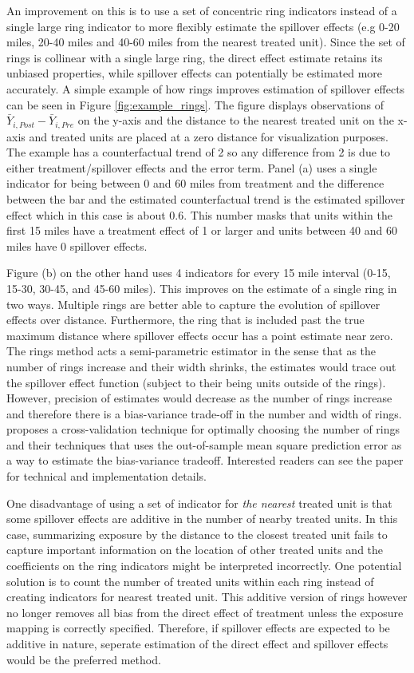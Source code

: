 \documentclass[11pt]{article}
\begin{document}
An improvement on this is to use a set of concentric ring indicators instead of a single large ring indicator to more flexibly estimate the spillover effects (e.g 0-20 miles, 20-40 miles and 40-60 miles from the nearest treated unit). Since the set of rings is collinear with a single large ring, the direct effect estimate retains its unbiased properties, while spillover effects can potentially be estimated more accurately. A simple example of how rings improves estimation of spillover effects can be seen in Figure \ref{fig:example_rings}. The figure displays observations of $\bar{Y}_{i,Post} - \bar{Y}_{i,Pre}$ on the y-axis and the distance to the nearest treated unit on the x-axis and treated units are placed at a zero distance for visualization purposes. The example has a counterfactual trend of 2 so any difference from 2 is due to either treatment/spillover effects and the error term. Panel (a) uses a single indicator for being between 0 and 60 miles from treatment and the difference between the bar and the estimated counterfactual trend is the estimated spillover effect which in this case is about 0.6. This number masks that units within the first 15 miles have a treatment effect of 1 or larger and units between 40 and 60 miles have 0 spillover effects. 

Figure (b) on the other hand uses 4 indicators for every 15 mile interval (0-15, 15-30, 30-45, and 45-60 miles). This improves on the estimate of a single ring in two ways. Multiple rings are better able to capture the evolution of spillover effects over distance. Furthermore, the ring that is included past the true maximum distance where spillover effects occur has a point estimate near zero. The rings method acts a semi-parametric estimator in the sense that as the number of rings increase and their width shrinks, the estimates would trace out the spillover effect function (subject to their being units outside of the rings). However, precision of estimates would decrease as the number of rings increase and therefore there is a bias-variance trade-off in the number and width of rings. \citet{Clarke_2017} proposes a cross-validation technique for optimally choosing the number of rings and their techniques that uses the out-of-sample mean square prediction error as a way to estimate the bias-variance tradeoff. Interested readers can see the paper for technical and implementation details.

One disadvantage of using a set of indicator for \textit{the nearest} treated unit is that some spillover effects are additive in the number of nearby treated units. In this case, summarizing exposure by the distance to the closest treated unit fails to capture important information on the location of other treated units and the coefficients on the ring indicators might be interpreted incorrectly. One potential solution is to count the number of treated units within each ring instead of creating indicators for nearest treated unit. This additive version of rings however no longer removes all bias from the direct effect of treatment unless the exposure mapping is correctly specified. Therefore, if spillover effects are expected to be additive in nature, seperate estimation of the direct effect and spillover effects would be the preferred method. 
\end{document}
